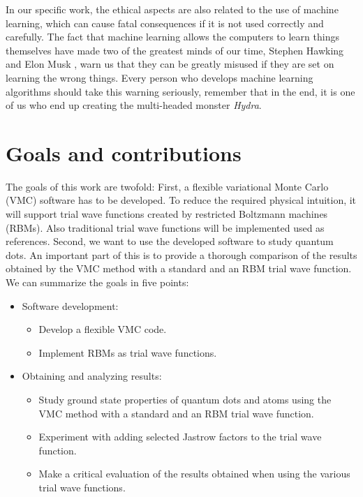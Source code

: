 In our specific work, the ethical aspects are also related to the use of machine learning, which can cause fatal consequences if it is not used correctly and carefully. The fact that machine learning allows the computers to learn things themselves have made two of the greatest minds of our time, Stephen Hawking \supercite{cellan-jones_hawking:_2014} and Elon Musk \supercite{vance_elon_2015}, warn us that they can be greatly misused if they are set on learning the wrong things. Every person who develops machine learning algorithms should take this warning seriously, remember that in the end, it is one of us who end up creating the multi-headed monster \textit{Hydra}.

\section{Goals and contributions} \label{sec:goals}
The goals of this work are twofold: First, a flexible variational Monte Carlo (VMC) software has to be developed. To reduce the required physical intuition, it will support trial wave functions created by restricted Boltzmann machines (RBMs). Also traditional trial wave functions will be implemented used as references. Second, we want to use the developed software to study quantum dots. An important part of this is to provide a thorough comparison of the results obtained by the VMC method with a standard and an RBM trial wave function. We can summarize the goals in five points:
\begin{itemize}
	\item Software development:
	\begin{itemize}
		\item Develop a flexible VMC code.
		\item Implement RBMs as trial wave functions.
	\end{itemize}
	\item Obtaining and analyzing results:
	\begin{itemize}
		\item Study ground state properties of quantum dots and atoms using the VMC method with a standard and an RBM trial wave function.
		\item Experiment with adding selected Jastrow factors to the trial wave function.
		\item Make a critical evaluation of the results obtained when using the various trial wave functions.
	\end{itemize}
\end{itemize}

